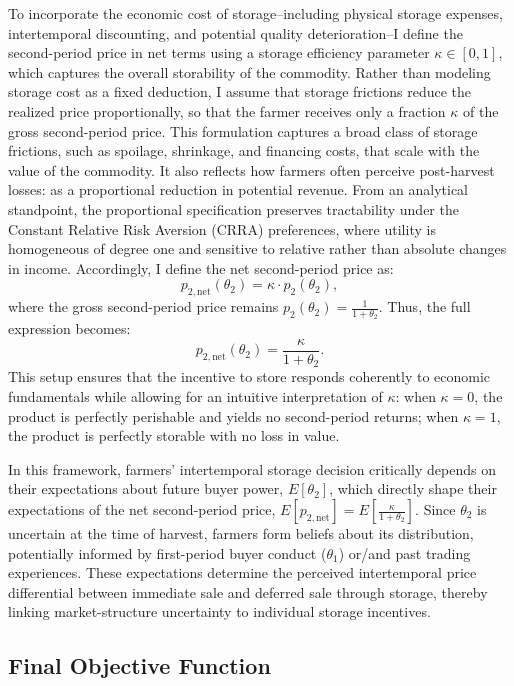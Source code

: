 To incorporate the economic cost of storage--including physical storage expenses, intertemporal discounting, and potential quality deterioration--I define the second-period price in net terms using a storage efficiency parameter $\kappa \in [0,1]$, which captures the overall storability of the commodity. Rather than modeling storage cost as a fixed deduction, I assume that storage frictions reduce the realized price proportionally, so that the farmer receives only a fraction $\kappa$ of the gross second-period price. This formulation captures a broad class of storage frictions, such as spoilage, shrinkage, and financing costs, that scale with the value of the commodity. It also reflects how farmers often perceive post-harvest losses: as a proportional reduction in potential revenue. From an analytical standpoint, the proportional specification preserves tractability under the Constant Relative Risk Aversion (CRRA) preferences, where utility is homogeneous of degree one and sensitive to relative rather than absolute changes in income. Accordingly, I define the net second-period price as:
$$
p_{2,\text{net}}(\theta_2) = \kappa \cdot p_2(\theta_2),
$$
where the gross second-period price remains $p_2(\theta_2) = \frac{1}{1 + \theta_2}$. Thus, the full expression becomes:
$$
p_{2,\text{net}}(\theta_2) = \frac{\kappa}{1 + \theta_2}.
$$
This setup ensures that the incentive to store responds coherently to economic fundamentals while allowing for an intuitive interpretation of $\kappa$: when $\kappa = 0$, the product is perfectly perishable and yields no second-period returns; when $\kappa = 1$, the product is perfectly storable with no loss in value.


In this framework, farmers' intertemporal storage decision critically depends on their expectations about future buyer power, $E[\theta_2]$, which directly shape their expectations of the net second-period price, $E[p_{2,\text{net}}] = E\!\left[\frac{\kappa}{1+\theta_2}\right]$. Since $\theta_2$ is uncertain at the time of harvest, farmers form beliefs about its distribution, potentially informed by first-period buyer conduct ($\theta_1$) or/and past trading experiences. These expectations determine the perceived intertemporal price differential between immediate sale and deferred sale through storage, thereby linking market-structure uncertainty to individual storage incentives.





\subsection{Final Objective Function}

